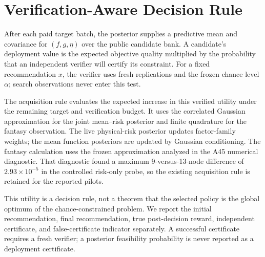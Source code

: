 \section{Verification-Aware Decision Rule}\label{sec:mp_decision}

After each paid target batch, the posterior supplies a predictive mean and
covariance for $(f,g,\eta)$ over the public candidate bank.  A candidate's
deployment value is the expected objective quality multiplied by the
probability that an independent verifier will certify its constraint.  For a
fixed recommendation $x$, the verifier uses fresh replications and the frozen
chance level $\alpha$; search observations never enter this test.

The acquisition rule evaluates the expected increase in this verified utility
under the remaining target and verification budget.  It uses the correlated
Gaussian approximation for the joint mean--risk posterior and finite
quadrature for the fantasy observation.  The live physical-risk posterior updates factor-family weights; the mean
function posteriors are updated by Gaussian conditioning.  The fantasy
calculation uses the frozen approximation analyzed in the
A45 numerical diagnostic.  That diagnostic found a maximum 9-versus-13-node
difference of $2.93\times10^{-5}$ in the controlled risk-only probe, so the
existing acquisition rule is retained for the reported pilots.

This utility is a decision rule, not a theorem that the selected policy is the
global optimum of the chance-constrained problem.  We report the initial
recommendation, final recommendation, true post-decision reward, independent
certificate, and false-certificate indicator separately.  A successful
certificate requires a fresh verifier; a posterior feasibility probability is
never reported as a deployment certificate.
